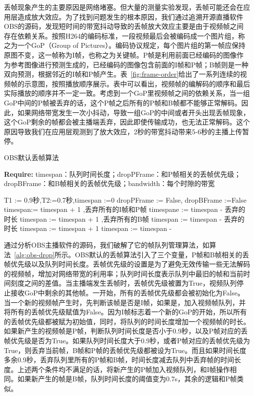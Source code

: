 丢帧现象产生的主要原因是网络堵塞。但大量的测量实验发现，丢帧可能还会在应用层造成放大效应。为了找到问题发生的根本原因，我们通过追溯开源直播软件OBS的源码，发现短时间的带宽抖动导致的丢帧放大效应主要是由于视频帧之间存在依赖关系。按照H264的编码标准，一段视频最后会被编码成一个图片组，称之为一个GoP（Group of Pictures）。编码协议规定，每个图片组的第一帧应保持原图不变，这一帧称为I帧，也称之为关键帧。P帧是利用前面已经编码的图像作为参考图像进行预测生成的，已经编码的图像包含前面的I帧和P帧；B帧则是一种双向预测，根据邻近的I帧和P帧产生。表~\ref{fig:frame-order}给出了一系列连续的视频帧的示意图，按照播放顺序展示。表中可以看出，视频帧的编解码的顺序和最后实际播放的顺序并不一定一致。考虑到一个GoP里视频帧之间的依赖关系，当一组GoP中间的P帧被丢弃的话，这个P帧之后所有的P帧和B帧都不能够正常解码。因此，如果网络带宽发生一次小抖动，导致一组GoP的中间或者开头出现丢帧现象，这个GoP剩余的帧都会被主播端丢弃，因此即使传输成功，也无法正常解码。这个原因导致我们在应用层观测到了放大效应，2秒的带宽抖动带来5-6秒的主播上传暂停。

\begin{algorithm}[htb]
\caption{OBS默认丢帧算法}
\label{alg:obs-drop}
{\bf Require:} timespan：队列时间长度；dropPFrame：和P帧相关的丢帧优先级；dropBFrame：和B帧相关的丢帧优先级；bandwidth：每个时隙的带宽
\begin{algorithmic}[1]
\State T1 := 0.9秒,T2:=0.7秒,timespan :=0
\State dropPFrame := False, dropBFrame :=False
\State {}
\State timespan:= timespan + 1
\EndIf
{}
\State {},丢弃所有的I帧和P帧
\State timespane := timespan - 丢弃的时长
\Else
\State {}
\State timespan := timespan + 1
\EndIf
\EndIf
{}
\State {},丢弃所有的B帧
\State timespan := timespan - 丢弃的时长
\Else
\State {}
\State timespan := timespan + 1
\EndIf
\EndIf
\State timespan := timespan - 
\end{algorithmic}
\end{algorithm}


通过分析OBS主播软件的源码，我们破解了它的帧队列管理算法，如算法~\ref{alg:obs-drop}所示。OBS默认的丢帧算法引入了三个变量，P帧和B帧相关的丢帧优先级以及队列时间长度。丢帧优先级的设置是为了避免无效传输一些无法解码的视频帧，增加对网络带宽的利用率；队列时间长度表示队列中最旧的帧和当前时间刻度之间的差值。当主播端发生丢帧时，丢帧优先级被置为True，视频队列停止接收GoP中剩余的其他帧。一开始，所有的丢帧优先级都会被初始化为False。当一个新的视频帧产生时，先判断该帧是否是I帧，如果是，加入视频帧队列，并将所有的丢帧优先级赋值为False。因为I帧标志着一个新的GoP的开始，所以所有的丢帧优先级都被赋为初始值，同时，将队列的时间长度增加一个视频帧的时长。如果新产生的视频帧是P帧，判断队列时间长度是否小于0.9秒，以及P帧对应的丢帧优先级是否为True。如果队列时间长度大于0.9秒，或者P帧对应的丢帧优先级为True，则丢弃当前帧，B帧和P帧的丢帧优先级都被设为True。而且如果时间长度多余0.9秒，丢弃队列里所有的P帧和B帧，时间长度减去队列中丢弃帧的时间长度。上述两个条件均不满足的话，将新产生的P帧加入视频队列，和I帧操作相同。如果新产生的帧是B帧，队列时间长度的阈值变为0.7s，其余的逻辑和P帧类似。

